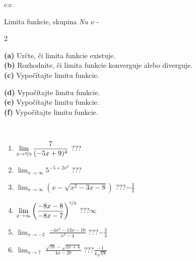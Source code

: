 \documentclass[10pt]{report}
\begin{document}
\begin{tabular}{c:c}
\begin{minipage}[c][104.5mm][t]{0.5\linewidth}
\begin{center}
\vspace{7mm}
{\huge Limita funkcie, skupina \textit{Nu $\nu$} -}\\[5mm]
\begin{minipage}{0.95\linewidth}
\begin{center}
{\small \begin{multicols}{2} \raggedright
\textbf{(a)} Určte, či limita funkcie existuje. \\[1mm]
\textbf{(b)} Rozhodnite, či limita funkcie konverguje alebo diverguje. \\[1mm]
\textbf{(c)} Vypočítajte limitu funkcie. \par \columnbreak
\textbf{(d)} Vypočítajte limitu funkcie. \\[1mm]
\textbf{(e)} Vypočítajte limitu funkcie. \\[1mm]
\textbf{(f)} Vypočítajte limitu funkcie. \\[1mm]
\end{multicols}
}
\end{center}
\end{minipage}
\\[4mm]
\begin{minipage}{0.79\linewidth}
\begin{center}
\begin{varwidth}{\linewidth}
\begin{enumerate}
\normalsize
\item $\displaystyle\lim_{x\to\nicefrac{9}{5}}{\frac{7}{(-5x+9)^{4}}}$\quad \dotfill\; ???\;\dotfill \quad {}
\item $\displaystyle\lim_{x\to\infty}{5^{-5+2x^2}}$\quad \dotfill\; ???\;\dotfill \quad {}
\item $\displaystyle\lim_{x\to\infty}{\left(x - \sqrt{x^2-3x-8}\right)}$\quad \dotfill\; ???\;\dotfill \quad $-\frac{3}{2}$
\item $\displaystyle\lim_{x\to\infty}{\left( \frac{-8x-8}{-8x-7} \right)^{\nicefrac{x}{2}}}$\quad \dotfill\; ???\;\dotfill \quad $\infty$
\item $\displaystyle\lim_{x\to -2}{\;\frac{-4x^2-13x-10}{x^2-4}}$\quad \dotfill\; ???\;\dotfill \quad $-\frac{3}{4}$
\item $\displaystyle\lim_{x\to 7}{\;\frac{\sqrt{18}-\sqrt{2x+4}}{4x-28}}$\quad \dotfill\; ???\;\dotfill \quad $\frac{-1}{4\sqrt{18}}$

\end{enumerate}
\end{varwidth}
\end{center}
\end{minipage}
\end{center}
\end{minipage}
\end{tabular}
\end{document}
